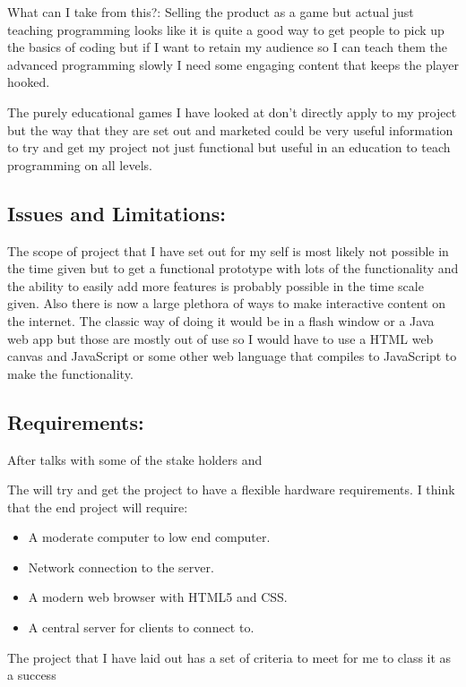 \documentclass[12pt]{article}
\begin{document}
What can I take from this?:\newline
Selling the product as a game but actual just teaching programming looks like it is quite a good way to get people to pick up the basics of coding but if I want to retain my audience so I can teach them the advanced programming slowly I need some engaging content that keeps the player hooked.

The purely educational games I have looked at don't directly apply to my project but the way that they are set out and marketed could be very useful information to try and get my project not just functional but useful in an education to teach programming on all levels.


\newpage
\subsection{Issues and Limitations:}
The scope of project that I have set out for my self is most likely not possible in the time given but to get a functional prototype with lots of the functionality and the ability to easily add more features is probably possible in the time scale given. Also there is now a large plethora of ways to make interactive content on the internet. The classic way of doing it would be in a flash window or a Java web app but those are mostly out of use so I would have to use a HTML web canvas and JavaScript or some other web language that compiles to JavaScript to make the functionality.

\subsection{Requirements:}
After talks with some of the stake holders and 

The will try and get the project to have a flexible hardware requirements. I think that the end project will require:
\begin{itemize}
    \item A moderate computer to low end computer.
    \item Network connection to the server.
    \item A modern web browser with HTML5 and CSS.
    \item A central server for clients to connect to.
\end{itemize}

The project that I have laid out has a set of criteria to meet for me to class it as a success
\end{document}
